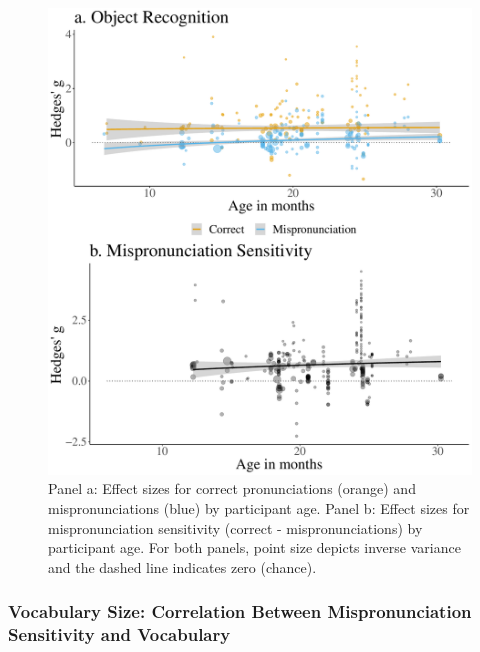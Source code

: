 \documentclass[man]{apa6}
\begin{document}
\begin{figure}
\centering
\includegraphics{VonHolzenBergmann_MPMetaAnalysis_files/figure-latex/PlotMPEffect-1.pdf}
\caption{\label{fig:PlotMPEffect}Panel a: Effect sizes for correct pronunciations (orange) and mispronunciations (blue) by participant age. Panel b: Effect sizes for mispronunciation sensitivity (correct - mispronunciations) by participant age. For both panels, point size depicts inverse variance and the dashed line indicates zero (chance).}
\end{figure}

\hypertarget{vocabulary-size-correlation-between-mispronunciation-sensitivity-and-vocabulary}{%
\subsubsection{Vocabulary Size: Correlation Between Mispronunciation Sensitivity and Vocabulary}\label{vocabulary-size-correlation-between-mispronunciation-sensitivity-and-vocabulary}}
\end{document}
